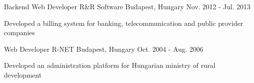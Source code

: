 \begin{cventries}
  \cventry
    {Backend Web Developer} %
    {R\&R Software} %
    {Budapest, Hungary} %
    {Nov. 2012 - Jul. 2013} %
    {
      \begin{cvitems} %
        \item {Developed a billing system for banking, telecommunication and public provider companies}
      \end{cvitems}
    }
  \cventry
    {Web Developer} %
    {R-NET} %
    {Budapest, Hungary} %
    {Oct. 2004 - Aug. 2006} %
    {
      \begin{cvitems} %
        \item {Developed an administration platform for Hungarian ministry of rural development}
      \end{cvitems}
    }

\end{cventries}
